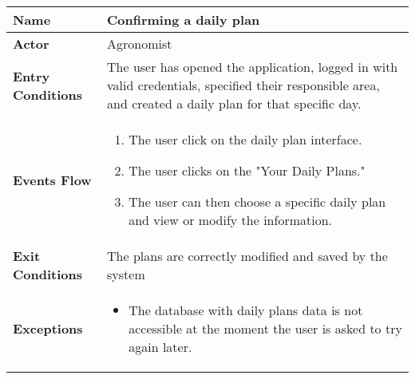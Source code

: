 
\begin{center}
\renewcommand{\arraystretch}{1.25}

\begin{tabular}{|l|>{\raggedright\arraybackslash}m{12cm}|}

    \hline
    \textbf{Name} & Confirming a daily plan\\
    \hline
   	\textbf{Actor} & Agronomist\\
    \hline
    \textbf{Entry Conditions} & The user has opened the application, logged in with valid credentials, specified their responsible area, and created a daily plan for that specific day.\\
    \hline
    \textbf{Events Flow} & \begin{enumerate}
            \item The user click on the daily plan interface.
            \item The user clicks on the "Your Daily Plans."
            \item The user can then choose a specific daily plan and view or modify the information.
       \end{enumerate}\\
    \hline
    \textbf{Exit Conditions} & The plans are correctly modified and saved by the system\\
    \hline
    \textbf{Exceptions} & 
       \begin{itemize}
          \item The database with daily plans data is not accessible at the moment the user is asked to try again later.
        \end{itemize}
     \\
    \hline
\end{tabular}
\end{center}